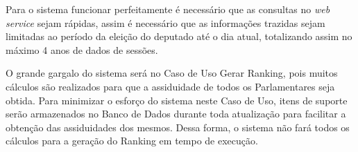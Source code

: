Para o sistema funcionar perfeitamente é necessário que as consultas no \textit{web service} sejam rápidas, assim é necessário que as informações trazidas sejam limitadas ao período da eleição do deputado até o dia atual, totalizando assim no máximo 4 anos de dados de sessões.

O grande gargalo do sistema será no Caso de Uso Gerar Ranking, pois muitos cálculos são realizados para que a assiduidade de todos os Parlamentares seja obtida. Para minimizar o esforço do sistema neste Caso de Uso, itens de suporte serão armazenados no Banco de Dados durante toda atualização para facilitar a obtenção das assiduidades dos mesmos. Dessa forma, o sistema não fará todos os cálculos para a geração do Ranking em tempo de execução.